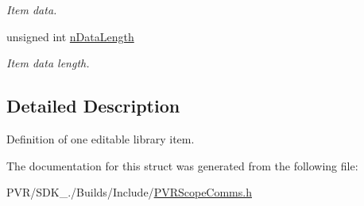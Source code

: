 \begin{DoxyCompactItemize}
\begin{DoxyCompactList}\small\item\em Item data. \end{DoxyCompactList}\item 
\hypertarget{struct_s_s_p_s_comms_library_item_a0dc7ebd970593b8958d35e879e4eb71d}{unsigned int \hyperlink{struct_s_s_p_s_comms_library_item_a0dc7ebd970593b8958d35e879e4eb71d}{n\+Data\+Length}}\label{struct_s_s_p_s_comms_library_item_a0dc7ebd970593b8958d35e879e4eb71d}

\begin{DoxyCompactList}\small\item\em Item data length. \end{DoxyCompactList}\end{DoxyCompactItemize}


\subsection{Detailed Description}
Definition of one editable library item. 



 

The documentation for this struct was generated from the following file\+:\begin{DoxyCompactItemize}
\item 
P\+V\+R/\+S\+D\+K\+\_./\+Builds/\+Include/\hyperlink{_p_v_r_scope_comms_8h}{P\+V\+R\+Scope\+Comms.\+h}\end{DoxyCompactItemize}
